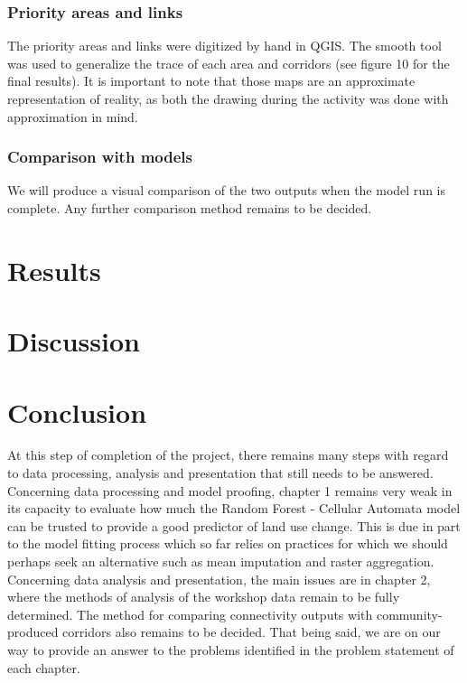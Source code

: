 \subsubsection*{Priority areas and links}

The priority areas and links were digitized by hand in QGIS. The smooth tool was used to generalize the trace of each area and corridors (see figure 10 for the final results). It is important to note that those maps  are an approximate representation of reality, as both the drawing during the activity was done with approximation in mind.

\subsubsection{Comparison with models}

We will produce a visual comparison of the two outputs when the model run is complete. Any further comparison method remains to be decided.

\section{Results}

\section{Discussion}

\section{Conclusion}

At this step of completion of the project, there remains many steps with regard to data processing, analysis and presentation that still needs to be answered. Concerning data processing and model proofing, chapter 1 remains very weak in its capacity to evaluate how much the Random Forest - Cellular Automata model can be trusted to provide a good predictor of land use change. This is due in part to the model fitting process which so far relies on practices for which we should perhaps seek an alternative such as mean imputation and raster aggregation. Concerning data analysis and presentation, the main issues are in chapter 2, where the methods of analysis of the workshop data remain to be fully determined. The method for comparing  connectivity outputs with community-produced corridors also remains to be decided. That being said, we are on our way to provide an answer to the problems identified in the problem statement of each chapter.

